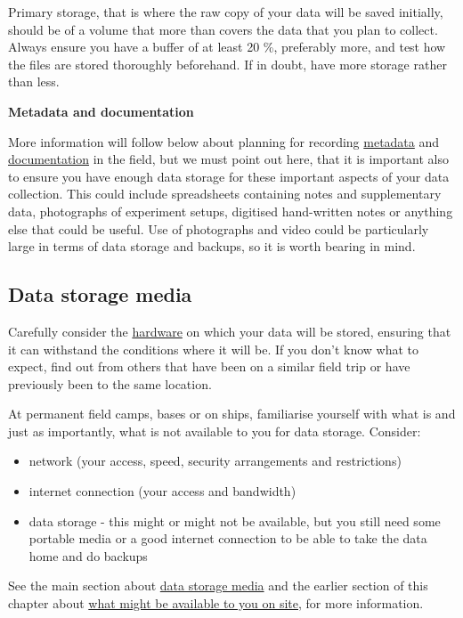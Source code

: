 \documentclass[a4paper,oneside]{report}
\providecommand{\tightlist}{%
  \setlength{\itemsep}{0pt}\setlength{\parskip}{0pt}}
\begin{document}
Primary storage, that is where the raw copy of your data will be saved
initially, should be of a volume that more than covers the data that you
plan to collect. Always ensure you have a buffer of at least 20 \%,
preferably more, and test how the files are stored thoroughly
beforehand. If in doubt, have more storage rather than less.

\textbf{Metadata and documentation}

More information will follow below about planning for recording
\protect\hyperlink{metadata}{metadata} and
\protect\hyperlink{documentation}{documentation} in the field, but we
must point out here, that it is important also to ensure you have enough
data storage for these important aspects of your data collection. This
could include spreadsheets containing notes and supplementary data,
photographs of experiment setups, digitised hand-written notes or
anything else that could be useful. Use of photographs and video could
be particularly large in terms of data storage and backups, so it is
worth bearing in mind.

\hypertarget{data-storage-media}{%
\subsection{Data storage media}\label{data-storage-media}}

Carefully consider the \protect\hyperlink{storing-data}{hardware} on
which your data will be stored, ensuring that it can withstand the
conditions where it will be. If you don't know what to expect, find out
from others that have been on a similar field trip or have previously
been to the same location.

At permanent field camps, bases or on ships, familiarise yourself with
what is and just as importantly, what is not available to you for data
storage. Consider:

\begin{itemize}
\tightlist
\item
  network (your access, speed, security arrangements and restrictions)
\item
  internet connection (your access and bandwidth)
\item
  data storage - this might or might not be available, but you still
  need some portable media or a good internet connection to be able to
  take the data home and do backups
\end{itemize}

See the main section about \protect\hyperlink{storing-data}{data storage
media} and the earlier section of this chapter about
\protect\hyperlink{on-site}{what might be available to you on site}, for
more information.
\end{document}
